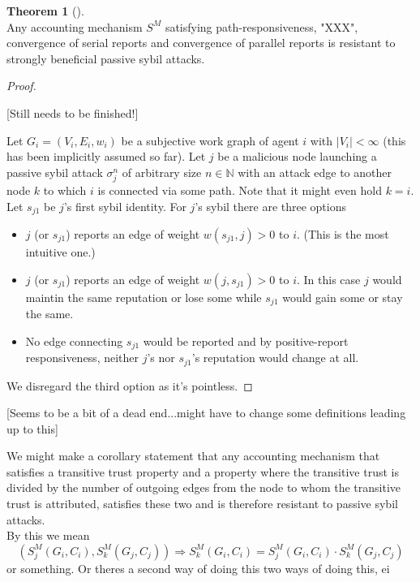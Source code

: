 \documentclass[11pt,a4paper]{report}
\theoremstyle{definition}
\theoremstyle{theorem}
\newtheorem{theorem}{Theorem}[section]
\theoremstyle{proposition}
\theoremstyle{corollary}
\theoremstyle{lemma}
\theoremstyle{example}
\theoremstyle{remark}
\begin{document}
\begin{theorem}[]\ \\
Any accounting mechanism $S^M$ satisfying path-responsiveness, "XXX", convergence of serial reports and convergence of parallel reports is resistant to strongly beneficial passive sybil attacks. 
\end{theorem}
\begin{proof}

\begin{center}
[Still needs to be finished!] \vspace{1em}\\
\end{center}

\noindent{}Let $G_i=(V_i,E_i,w_i)$ be a subjective work graph of agent $i$ with $|V_i|<\infty$ (this has been implicitly assumed so far). Let $j$ be a malicious node launching a passive sybil attack $\sigma_j^n$ of arbitrary size $n\in\mathbb{N}$ with an attack edge to another node $k$ to which $i$ is connected via some path. Note that it might even hold $k=i$.  Let $s_{j1}$ be $j$'s first sybil identity. For $j$'s sybil there are three options
\begin{itemize}
\item $j$ (or $s_{j1}$) reports an edge of weight $w(s_{j1},j)>0$ to $i$. (This is the most intuitive one.)
\item $j$ (or $s_{j1}$) reports an edge of weight $w(j,s_{j1})>0$ to $i$. In this case $j$ would maintin the same reputation or lose some while $s_{j1}$ would gain some or stay the same.
\item No edge connecting $s_{j1}$ would be reported and by positive-report responsiveness, neither $j$'s nor $s_{j1}$'s reputation would change at all.
\end{itemize}
\noindent{}We disregard the third option as it's pointless. 
\end{proof}

\noindent{}\begin{center}[Seems to be a bit of a dead end...might have to change some definitions leading up to this]\end{center}
\noindent{}We might make a corollary statement that any accounting mechanism that satisfies a transitive trust property and a property where the transitive trust is divided by the number of outgoing edges from the node to whom the transitive trust is attributed, satisfies these two and is therefore resistant to passive sybil attacks. \vspace{1em}\\ 
\noindent{}By this we mean
\[
(S^M_j(G_i,C_i), S^M_k(G_j,C_j)) \Rightarrow{}S^M_k(G_i,C_i)=S^M_j(G_i,C_i)\cdot{}S^M_k(G_j,C_j)
\]
or something. Or theres a second way of doing this two ways of doing this, ei
\end{document}
